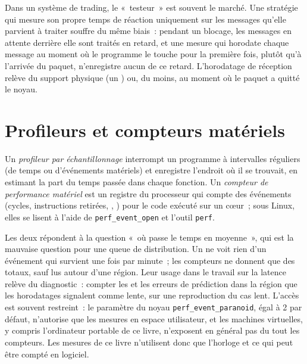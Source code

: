 Dans un système de trading, le «~testeur~» est souvent le marché. Une stratégie qui mesure son propre temps de réaction uniquement sur les
messages qu'elle parvient à traiter souffre du même biais~: pendant un blocage, les messages en attente derrière elle sont traités en retard,
et une mesure qui horodate chaque message au moment où le programme le touche pour la première fois, plutôt qu'à l'arrivée du paquet,
n'enregistre aucun de ce retard. L'horodatage de réception relève du support physique (un ) ou, du moins, au
moment où le paquet a quitté le noyau.

\section{Profileurs et compteurs matériels}

\begin{definition}\label{def:ll:measuring-latency:prof}
Un \emph{profileur par échantillonnage} interrompt un programme à intervalles réguliers (de temps ou
d'événements matériels) et enregistre l'endroit où il se trouvait, en estimant la part du temps passée dans chaque fonction. Un \emph{compteur de performance
matériel} est un registre du processeur qui compte des événements (cycles, instructions
retirées, , ) pour le code exécuté sur un cœur~; sous Linux, elles se lisent à l'aide de
\texttt{perf\_event\_open} et l'outil \texttt{perf}.
\end{definition}

Les deux répondent à la question «~où passe le temps en moyenne~», qui est la mauvaise question pour une queue de distribution. Un  ne voit
rien d'un événement qui survient une fois par minute~; les compteurs ne donnent que des totaux, sauf lus autour d'une région. Leur usage dans le travail sur la
latence relève du diagnostic~: compter les  et les erreurs de prédiction dans la région que les horodatages signalent comme lente, sur une
reproduction du cas lent. L'accès est souvent restreint~: le paramètre du noyau \texttt{perf\_event\_paranoid}, égal à 2 par défaut,
n'autorise que les mesures en espace utilisateur, et les machines virtuelles, y compris l'ordinateur portable de ce livre, n'exposent en général
pas du tout les compteurs. Les mesures de ce livre n'utilisent donc que l'horloge et ce qui peut être compté en logiciel.

